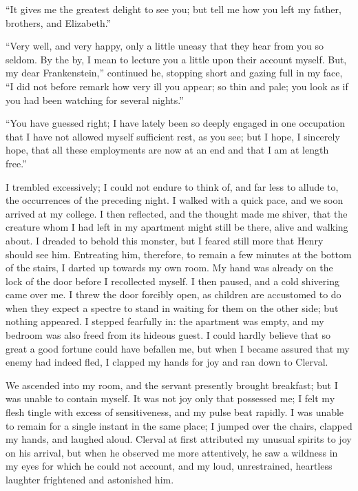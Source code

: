 \documentclass[12pt,openright]{book}
\begin{document}
“It gives me the greatest delight to see you; but tell me how you left my father, brothers, and Elizabeth.”

“Very well, and very happy, only a little uneasy that they hear from you so seldom. By the by, I mean to lecture you a little upon their account myself. But, my dear Frankenstein,” continued he, stopping short and gazing full in my face, “I did not before remark how very ill you appear; so thin and pale; you look as if you had been watching for several nights.”

“You have guessed right; I have lately been so deeply engaged in one occupation that I have not allowed myself sufficient rest, as you see; but I hope, I sincerely hope, that all these employments are now at an end and that I am at length free.”

I trembled excessively; I could not endure to think of, and far less to allude to, the occurrences of the preceding night. I walked with a quick pace, and we soon arrived at my college. I then reflected, and the thought made me shiver, that the creature whom I had left in my apartment might still be there, alive and walking about. I dreaded to behold this monster, but I feared still more that Henry should see him. Entreating him, therefore, to remain a few minutes at the bottom of the stairs, I darted up towards my own room. My hand was already on the lock of the door before I recollected myself. I then paused, and a cold shivering came over me. I threw the door forcibly open, as children are accustomed to do when they expect a spectre to stand in waiting for them on the other side; but nothing appeared. I stepped fearfully in: the apartment was empty, and my bedroom was also freed from its hideous guest. I could hardly believe that so great a good fortune could have befallen me, but when I became assured that my enemy had indeed fled, I clapped my hands for joy and ran down to Clerval.

We ascended into my room, and the servant presently brought breakfast; but I was unable to contain myself. It was not joy only that possessed me; I felt my flesh tingle with excess of sensitiveness, and my pulse beat rapidly. I was unable to remain for a single instant in the same place; I jumped over the chairs, clapped my hands, and laughed aloud. Clerval at first attributed my unusual spirits to joy on his arrival, but when he observed me more attentively, he saw a wildness in my eyes for which he could not account, and my loud, unrestrained, heartless laughter frightened and astonished him.
\end{document}
